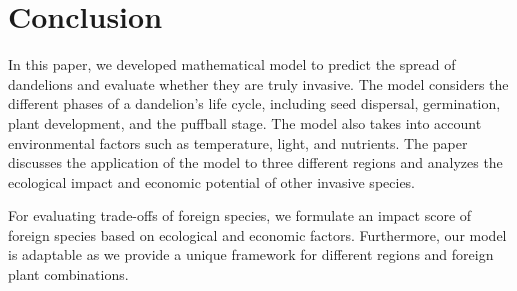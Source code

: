 \section{Conclusion}
In this paper, we developed mathematical model to predict the spread of dandelions and evaluate whether they are truly invasive. The model considers the different phases of a dandelion's life cycle, including seed dispersal, germination, plant development, and the puffball stage. The model also takes into account environmental factors such as temperature, light, and nutrients. The paper discusses the application of the model to three different regions and analyzes the ecological impact and economic potential of other invasive species.

For evaluating trade-offs of foreign species, we formulate an impact score of foreign species based on ecological and economic factors. Furthermore, our model is adaptable as we provide a unique framework for different regions and foreign plant combinations. 